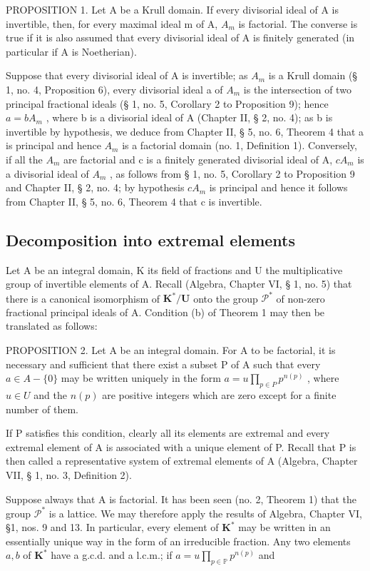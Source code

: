 PROPOSITION 1. Let A be a Krull domain. If every divisorial ideal of A is invertible, then, for every maximal ideal m of A, \(A_{m}\) is factorial. The converse is true if it is also assumed that every divisorial ideal of A is finitely generated (in particular if A is Noetherian).

Suppose that every divisorial ideal of A is invertible; as \(A_{m}\) is a Krull domain (§ 1, no. 4, Proposition 6), every divisorial ideal a of \(A_{m}\) is the intersection of two principal fractional ideals (§ 1, no. 5, Corollary 2 to Proposition 9); hence \(a = bA_{m}\) , where b is a divisorial ideal of A (Chapter II, § 2, no. 4); as b is invertible by hypothesis, we deduce from Chapter II, § 5, no. 6, Theorem 4 that a is principal and hence \(A_{m}\) is a factorial domain (no. 1, Definition 1). Conversely, if all the \(A_{m}\) are factorial and c is a finitely generated divisorial ideal of A, \(cA_{m}\) is a divisorial ideal of \(A_{m}\) , as follows from § 1, no. 5, Corollary 2 to Proposition 9 and Chapter II, § 2, no. 4; by hypothesis \(cA_{m}\) is principal and hence it follows from Chapter II, § 5, no. 6, Theorem 4 that c is invertible.

\subsection{Decomposition into extremal elements}

Let A be an integral domain, K its field of fractions and U the multiplicative group of invertible elements of A. Recall (Algebra, Chapter VI, § 1, no. 5) that there is a canonical isomorphism of \(\mathbf{K}^* / \mathbf{U}\) onto the group \(\mathcal{P}^*\) of non-zero fractional principal ideals of A. Condition (b) of Theorem 1 may then be translated as follows:

PROPOSITION 2. Let A be an integral domain. For A to be factorial, it is necessary and sufficient that there exist a subset P of A such that every \(a \in A - \{0\}\) may be written uniquely in the form \(a = u \prod_{p \in P} p^{n(p)}\) , where \(u \in U\) and the \(n(p)\) are positive integers which are zero except for a finite number of them.

If P satisfies this condition, clearly all its elements are extremal and every extremal element of A is associated with a unique element of P. Recall that P is then called a representative system of extremal elements of A (Algebra, Chapter VII, § 1, no. 3, Definition 2).

Suppose always that A is factorial. It has been seen (no. 2, Theorem 1) that the group \(\mathcal{P}^*\) is a lattice. We may therefore apply the results of Algebra, Chapter VI, §1, nos. 9 and 13. In particular, every element of \(\mathbf{K}^*\) may be written in an essentially unique way in the form of an irreducible fraction. Any
two elements \(a, b\) of \(\mathbf{K}^*\) have a g.c.d. and a l.c.m.; if \(a = u\prod_{p\in \mathbb{P}}p^{n(p)}\) and

